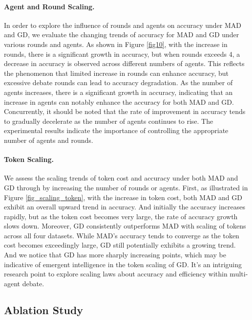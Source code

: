 \paragraph{Agent and Round Scaling.} In order to explore the influence of rounds and agents on accuracy under MAD and GD, we evaluate the changing trends of accuracy for MAD and GD under various rounds and agents. As shown in Figure \ref{fig10}, with the increase in rounds, there is a significant growth in accuracy, but when rounds exceeds 4, a decrease in accuracy is observed across different numbers of agents. This reflects the phenomenon that limited increase in rounds can enhance accuracy, but excessive debate rounds can lead to accuracy degradation. As the number of agents increases, there is a significant growth in accuracy, indicating that an increase in agents can notably enhance the accuracy for both MAD and GD. Concurrently, it should be noted that the rate of improvement in accuracy tends to gradually decelerate as the number of agents continues to rise. The experimental results indicate the importance of controlling the appropriate number of agents and rounds.

\paragraph{Token Scaling.} We assess the scaling trends of token cost and accuracy under both MAD and GD through by increasing the number of rounds or agents. First, as illustrated in Figure \ref{fig_scaling_token}, with the increase in token cost, both MAD and GD exhibit an overall upward trend in accuracy. And initially the accuracy increases rapidly, but as the token cost becomes very large, the rate of accuracy growth slows down. Moreover, GD consistently outperforms MAD with scaling of tokens across all four datasets. While MAD's accuracy tends to converge as the token cost becomes exceedingly large, GD still potentially exhibits a growing trend. And we notice that GD has more sharply increasing points, which may be indicative of emergent intelligence in the token scaling of GD. It's an intriguing research point to explore scaling laws about accuracy and efficiency within multi-agent debate.

\subsection{Ablation Study}
\label{ablation-study}


